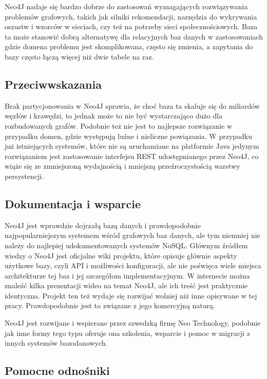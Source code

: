 Neo4J nadaje się bardzo dobrze do zastosowań wymagających rozwiązywania problemów grafowych, takich jak silniki rekomendacji, narzędzia do wykrywania oszustw i wzorców w sieciach, czy też na potrzeby sieci społecznościowych.
Baza ta może stanowić dobrą alternatywę dla relacyjnych baz danych w zastosowaniach gdzie domena problemu jest skomplikowana, często się zmienia, a zapytania do bazy często łączą więcej niż dwie tabele na raz.

\subsection*{Przeciwwskazania}

Brak partycjonowania w Neo4J sprawia, że choć baza ta skaluje się do miliardów węzłów i krawędzi, to jednak może to nie być wystarczająco dużo dla rozbudowanych grafów.
Podobnie też nie jest to najlepsze rozwiązanie w przypadku domen, gdzie występują luźne i nieliczne powiązania.
W przypadku już istniejących systemów, które nie są uruchamiane na platformie Java jedynym rozwiązaniem jest zastosowanie interfejsu REST udostępnianego przez Neo4J, co wiąże się ze zmniejszoną wydajnością i mniejszą przeźroczystością warstwy persystencji.

\subsection*{Dokumentacja i wsparcie}

Neo4J jest wprawdzie dojrzałą bazą danych i prawdopodobnie najpopularniejszym systemem wśród grafowych baz danych, ale tym niemniej nie należy do najlepiej udokumentowanych systemów NoSQL.
Głównym źródłem wiedzy o Neo4J jest oficjalne wiki projektu, które opisuje głównie aspekty użytkowe bazy, czyli API i możliwości konfiguracji, ale nie poświęca wiele miejsca architekturze tej baz i jej szczegółom implementacyjnym.
W internecie można znaleźć kilka prezentacji wideo na temat Neo4J, ale ich treść jest praktycznie identyczna.
Projekt ten też wydaje się rozwijać wolniej niż inne opisywane w tej pracy.
Prawdopodobnie jest to związane z jego komercyjną naturą.

Neo4J jest rozwijane i wspierane przez szwedzką firmę Neo Technology, podobnie jak inne formy tego typu oferuje ona szkolenia, wsparcie i pomoc w migracji z innych systemów bazodanowych.

\subsection*{Pomocne odnośniki}

